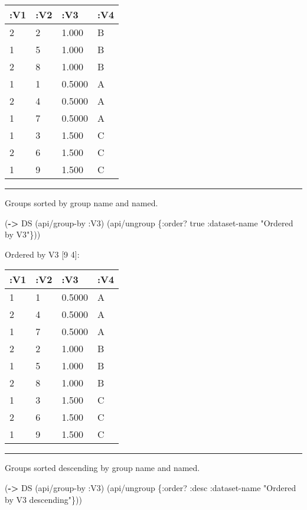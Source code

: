 \documentclass[]{article}
\newenvironment{Shaded}{\begin{snugshade}}{\end{snugshade}}
\newcommand{\KeywordTok}[1]{\textcolor[rgb]{0.13,0.29,0.53}{\textbf{#1}}}
\newcommand{\StringTok}[1]{\textcolor[rgb]{0.31,0.60,0.02}{#1}}
\newcommand{\VariableTok}[1]{\textcolor[rgb]{0.00,0.00,0.00}{#1}}
\newcommand{\AttributeTok}[1]{\textcolor[rgb]{0.77,0.63,0.00}{#1}}
\newcommand{\NormalTok}[1]{#1}
\begin{document}
\begin{longtable}[]{@{}llll@{}}
\toprule
:V1 & :V2 & :V3 & :V4\tabularnewline
\midrule
\endhead
2 & 2 & 1.000 & B\tabularnewline
1 & 5 & 1.000 & B\tabularnewline
2 & 8 & 1.000 & B\tabularnewline
1 & 1 & 0.5000 & A\tabularnewline
2 & 4 & 0.5000 & A\tabularnewline
1 & 7 & 0.5000 & A\tabularnewline
1 & 3 & 1.500 & C\tabularnewline
2 & 6 & 1.500 & C\tabularnewline
1 & 9 & 1.500 & C\tabularnewline
\bottomrule
\end{longtable}

\begin{center}\rule{0.5\linewidth}{0.5pt}\end{center}

Groups sorted by group name and named.

\begin{Shaded}
\begin{Highlighting}[]
\NormalTok{(}\KeywordTok{->}\NormalTok{ DS}
\NormalTok{    (api/group-by }\AttributeTok{:V3}\NormalTok{)}
\NormalTok{    (api/ungroup \{}\AttributeTok{:order}\NormalTok{? }\VariableTok{true}
                  \AttributeTok{:dataset-name} \StringTok{"Ordered by V3"}\NormalTok{\}))}
\end{Highlighting}
\end{Shaded}

Ordered by V3 {[}9 4{]}:

\begin{longtable}[]{@{}llll@{}}
\toprule
:V1 & :V2 & :V3 & :V4\tabularnewline
\midrule
\endhead
1 & 1 & 0.5000 & A\tabularnewline
2 & 4 & 0.5000 & A\tabularnewline
1 & 7 & 0.5000 & A\tabularnewline
2 & 2 & 1.000 & B\tabularnewline
1 & 5 & 1.000 & B\tabularnewline
2 & 8 & 1.000 & B\tabularnewline
1 & 3 & 1.500 & C\tabularnewline
2 & 6 & 1.500 & C\tabularnewline
1 & 9 & 1.500 & C\tabularnewline
\bottomrule
\end{longtable}

\begin{center}\rule{0.5\linewidth}{0.5pt}\end{center}

Groups sorted descending by group name and named.

\begin{Shaded}
\begin{Highlighting}[]
\NormalTok{(}\KeywordTok{->}\NormalTok{ DS}
\NormalTok{    (api/group-by }\AttributeTok{:V3}\NormalTok{)}
\NormalTok{    (api/ungroup \{}\AttributeTok{:order}\NormalTok{? }\AttributeTok{:desc}
                  \AttributeTok{:dataset-name} \StringTok{"Ordered by V3 descending"}\NormalTok{\}))}
\end{Highlighting}
\end{Shaded}
\end{document}
